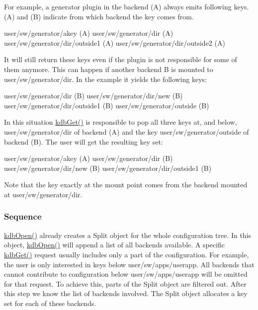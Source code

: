 For example, a generator plugin in the backend (A) always emits following keys. (A) and (B) indicate from which backend the key comes from.


\begin{DoxyCode}
user/sw/generator/akey (A)
user/sw/generator/dir (A)
user/sw/generator/dir/outside1 (A)
user/sw/generator/dir/outside2 (A)
\end{DoxyCode}


It will still return these keys even if the plugin is not responsible for some of them anymore. This can happen if another backend B is mounted to {\ttfamily user/sw/generator/dir}. In the example it yields the following keys\+:


\begin{DoxyCode}
user/sw/generator/dir (B)
user/sw/generator/dir/new (B)
user/sw/generator/dir/outside1 (B)
user/sw/generator/outside (B)
\end{DoxyCode}


In this situation {\ttfamily \hyperlink{group__kdb_ga28e385fd9cb7ccfe0b2f1ed2f62453a1}{kdb\+Get()}} is responsible to pop all three keys at, and below, {\ttfamily user/sw/generator/dir} of backend (A) and the key {\ttfamily user/sw/generator/outside} of backend (B). The user will get the resulting key set\+:


\begin{DoxyCode}
user/sw/generator/akey (A)
user/sw/generator/dir (B)
user/sw/generator/dir/new (B)
user/sw/generator/dir/outside1 (B)
\end{DoxyCode}


Note that the key exactly at the mount point comes from the backend mounted at {\ttfamily user/sw/generator/dir}.

\subsubsection*{Sequence}

{\ttfamily \hyperlink{group__kdb_ga6808defe5870f328dd17910aacbdc6ca}{kdb\+Open()}} already creates a {\ttfamily Split} object for the whole configuration tree. In this object, {\ttfamily \hyperlink{group__kdb_ga6808defe5870f328dd17910aacbdc6ca}{kdb\+Open()}} will append a list of all backends available. A specific {\ttfamily \hyperlink{group__kdb_ga28e385fd9cb7ccfe0b2f1ed2f62453a1}{kdb\+Get()}} request usually includes only a part of the configuration. For example, the user is only interested in keys below {\ttfamily user/sw/apps/userapp}. All backends that cannot contribute to configuration below {\ttfamily user/sw/apps/userapp} will be omitted for that request. To achieve this, parts of the {\ttfamily Split} object are filtered out. After this step we know the list of backends involved. The {\ttfamily Split} object allocates a key set for each of these backends.

